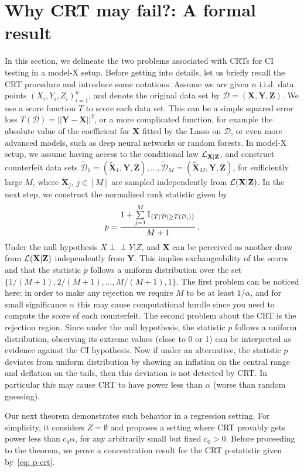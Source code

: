 \documentclass[11pt]{article}
\newcommand{\indep}{\perp \!\!\! \perp}
\def\cD{\mathcal{D}}
\def\tcD {\widetilde{\mathcal{D}}}
\def\bX{\mathbf{X}}
\def\bY{\mathbf{Y}}
\def\bZ{\mathbf{Z}}
\def\tbX{\widetilde{\bX}}
\begin{document}
\section{Why CRT may fail?: A formal result}\label{sec: crt-failure}
In this section, we delineate the two problems associated with CRTs for CI testing in a model-X setup. Before getting into details, let us briefly recall the CRT procedure and introduce some notations. Assume we are given $n$ i.i.d. data points $(X_i,Y_i,Z_i)_{i=1}^n$, and denote the original data set by $\cD=(\bX,\bY,\bZ)$. We use a score function $T$ to score each data set. This can be a simple squared error loss $T(\cD)=||\bY-\bX||^2$, or a more complicated function, for example the absolute value of the coefficient for $\bX$ fitted by the Lasso on $\cD$, or even more advanced models, such as deep neural networks or random forests. In model-X setup, we assume having access to the conditional law $\cL_{\bX|\bZ}$, and construct counterfeit data sets $\tcD_1=(\tbX_1,\bY,\bZ),...,\tcD_M=(\tbX_M,\bY,\bZ)$, for sufficiently large $M$, where $\tbX_j$, $j\in[M]$ are sampled independently from $\cL({\bX|\bZ})$.  In the next step, we construct the normalized rank statistic given by
%
\[
p=\frac{1+\sum\limits_{j=1}^{M}\ind_{ \{T(\cD)\geq T(\cD_i) \} }}{M+1}\,.
\]
%
Under the null hypothesis $X \indep Y| Z$, and $\bX$ can be perceived as another draw from $\cL(\bX|\bZ)$ independently from $\bY$. This implies exchangeability of the scores and that the statistic $p$ follows a uniform distribution over the set $\{1/(M+1),2/(M+1),...,M/(M+1),1\}$. The first problem can be noticed here: in order to make any rejection we require $M$ to be at least $1/\alpha$, and for small significance $\alpha$ this may cause computational hurdle since you need to compute the score of each counterfeit. The second problem about the CRT  is the rejection region. Since under the null hypothesis, the statistic $p$ follows a uniform distribution, observing its extreme values (close to 0 or 1) can be interpreted as evidence against the CI hypothesis. 
Now if under an alternative, the statistic $p$ deviates from uniform distribution by showing an inflation on the central range and deflation on the tails, then this deviation is not detected by CRT. In particular this may cause CRT to have power less than $\alpha$ (worse than random guessing).

Our next theorem demonstrates such behavior in a regression setting. For simplicity, it considers $Z= \emptyset$ and proposes a setting where CRT provably gets power less than $c_0 \alpha$, for any arbitrarily small but fixed $c_0>0$. Before proceeding to the theorem, we prove a concentration result for the CRT p-statistic given by~\eqref{eq: p-crt}.
\end{document}
